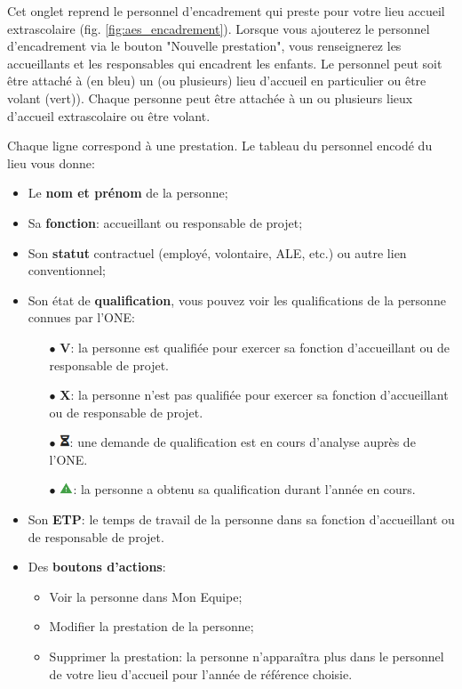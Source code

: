 Cet onglet reprend le personnel d'encadrement qui preste pour votre lieu accueil extrascolaire (fig. \ref{fig:aes_encadrement}). Lorsque vous ajouterez le personnel d'encadrement via le bouton "Nouvelle prestation", vous renseignerez les accueillants et les responsables qui encadrent les enfants. Le personnel peut soit être attaché à (en \textcolor{bleu}{bleu}) un (ou plusieurs) lieu d'accueil en particulier ou être volant (\textcolor{vert}{vert})). Chaque personne peut être attachée à un ou plusieurs lieux d'accueil extrascolaire ou être volant. 

Chaque ligne correspond à une prestation. Le tableau du personnel encodé du lieu vous donne:
\begin{itemize}
    \item Le \textbf{nom et prénom} de la personne;
    \item Sa \textbf{fonction}: accueillant ou responsable de projet;
    \item Son \textbf{statut} contractuel (employé, volontaire, ALE, etc.) ou autre lien conventionnel;
    \item Son état de \textbf{qualification}, vous pouvez voir les qualifications de la personne connues par l'ONE:
        \begin{itemize}
            \item [$\bullet$]\textbf{\textcolor{bleu}{V}}: la personne est qualifiée pour exercer sa fonction d'accueillant ou de responsable de projet. 
            \item [$\bullet$]\textbf{\textcolor{rouge}{X}}: la personne n'est pas qualifiée pour exercer sa fonction d'accueillant ou de responsable de projet. 
            \item [$\bullet$]\includegraphics[width=0.3cm]{Images/icon/icon_sablier.png}: une demande de qualification est en cours d'analyse auprès de l'ONE. 
            \item [$\bullet$]\includegraphics[width=0.4cm]{Images/icon/icon_attention.png}: la personne a obtenu sa qualification durant l'année en cours.
\end{itemize}
\vspace*{3mm}

    \item Son \textbf{ETP}: le temps de travail de la personne dans sa fonction d'accueillant ou de responsable de projet.
    \item Des \textbf{boutons d'actions}:
    \begin{itemize}
        \item Voir la personne dans Mon Equipe;
        \item Modifier la prestation de la personne;
        \item Supprimer la prestation: la personne n'apparaîtra plus dans le personnel de votre lieu d'accueil pour l'année de référence choisie.
    \end{itemize}
\end{itemize}



